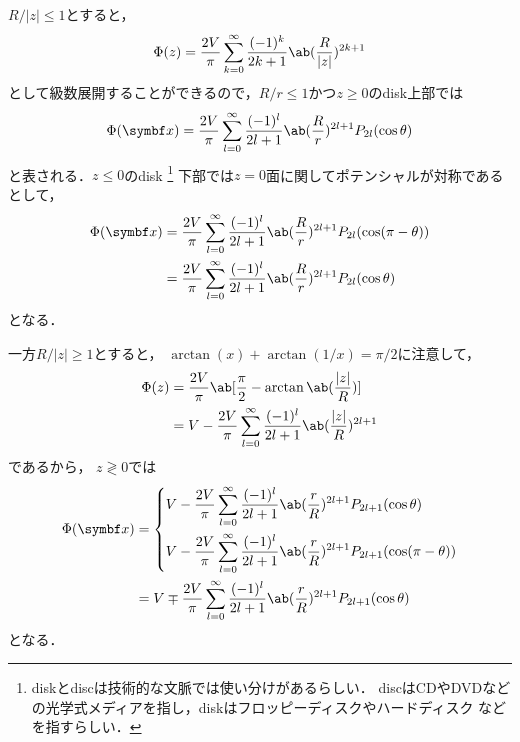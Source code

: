   $R / |z| \leq 1$とすると，
  \begin{gather}%
    \Phi(z) = \frac{2V}{\pi} \sum_{k=0}^\infty \frac{(-1)^k}{2k+1} \ab(\frac{R}{|z|})^{2k+1}
  \end{gather}%
  として級数展開することができるので，$R / r \leq 1$かつ$z \geq 0$のdisk上部では
  \begin{gather}%
    \Phi(\bs{x}) = 
    \frac{2V}{\pi}\sum_{l=0}^\infty \frac{(-1)^l}{2l+1} \ab(\frac{R}{r})^{2l+1}
    P_{2l}(\cos\theta)
  \end{gather}%
  と表される．$z \leq 0$のdisk%
  \footnote{diskとdiscは技術的な文脈では使い分けがあるらしい．
  discはCDやDVDなどの光学式メディアを指し，diskはフロッピーディスクやハードディスク
  などを指すらしい．}
  下部では$z=0$面に関してポテンシャルが対称である
  として，
  \begin{align}%
    \Phi(\bs{x}) & = \frac{2V}{\pi}\sum_{l=0}^\infty \frac{(-1)^l}{2l+1} \ab(\frac{R}{r})^{2l+1}
    P_{2l}(\cos(\pi-\theta))\\
    &= 
    \frac{2V}{\pi}\sum_{l=0}^\infty \frac{(-1)^l}{2l+1} \ab(\frac{R}{r})^{2l+1}
    P_{2l}(\cos\theta)
  \end{align}%
  となる．

  一方$R / |z| \geq 1$とすると，
  $\arctan(x) + \arctan(1/x) = \pi/2$に注意して，
  \begin{align}%
    \Phi(z) &= \frac{2V}{\pi}\ab[\frac{\pi}{2}-\arctan\ab(\frac{|z|}{R})]\notag\\
    &= V - \frac{2V}{\pi} \sum_{l=0}^\infty \frac{(-1)^l}{2l+1}\ab(\frac{|z|}{R})^{2l+1}
  \end{align}%
  であるから，
  $z \gtrless 0$では
  \begin{align}%
    \Phi(\bs{x}) &=
    \begin{dcases}
      V - \frac{2V}{\pi} \sum_{l=0}^\infty \frac{(-1)^l}{2l+1} \ab(\frac rR)^{2l+1} P_{2l+1}(\cos\theta)\\
      V - \frac{2V}{\pi} \sum_{l=0}^\infty \frac{(-1)^l}{2l+1} \ab(\frac rR)^{2l+1} P_{2l+1}(\cos(\pi-\theta))
    \end{dcases}\notag\\
    &= V \mp \frac{2V}{\pi}
    \sum_{l=0}^\infty \frac{(-1)^l}{2l+1} \ab(\frac rR)^{2l+1} P_{2l+1}(\cos\theta)
  \end{align}
  となる．

